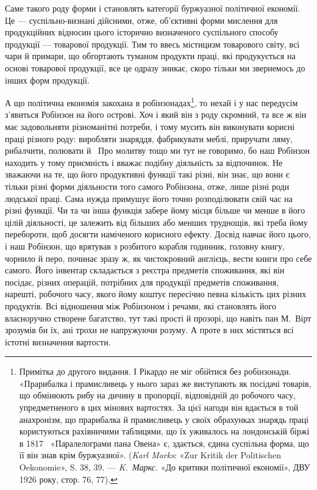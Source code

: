 
Саме такого роду форми і становлять категорії буржуазної
політичної економії. Це — суспільно-визнані дійсними, отже,
об’єктивні форми мислення для продукційних відносин цього
історично визначеного суспільного способу продукції — товарової
продукції. Тим то ввесь містицизм товарового світу, всі чари й
примари, що обгортають туманом продукти праці, які продукується
на основі товарової продукції, все це одразу зникає, скоро
тільки ми звернемось до інших форм продукції.

А що політична економія закохана в робінзонадах\footnote{
Примітка до другого видання. І Рікардо не міг обійтися без робінзонади.
«Прарибалка і прамисливець у нього зараз же виступають
як посідачі товарів, що обмінюють рибу на дичину в пропорції, відповідній
до робочого часу, упредметненого в цих мінових вартостях. За цієї
нагоди він вдається в той анахронізм, що прарибалка й прамисливець
у своїх обрахунках знарядь праці користуються рахівничими таблицями,
що їх уживалось на лондонській біржі в 1817~ «Паралелограми пана
Овена» є, здається, єдина суспільна форма, що її він знав крім буржуазної».
(\emph{Karl Marks}: «Zur Kritik der Politischen Oekonomie», S. 38, 39. —
\emph{K.~Маркс.} «До критики політичної економії», ДВУ 1926 року,
стор. 76, 77).
}, то нехай
і у нас передусім з’явиться Робінзон на його острові. Хоч і який
він з роду скромний, та все ж він має задовольняти різноманітні
потреби, і тому мусить він виконувати корисні праці різного
роду: виробляти знаряддя, фабрикувати меблі, приручати ляму,
рибалчити, полювати й~ Про молитву тощо ми тут не говоримо,
бо наш Робінзон находить у тому приємність і вважає подібну
діяльність за відпочинок. Не зважаючи на те, що його продуктивні
функції такі різні, він знає, що вони є тільки різні форми
діяльности того самого Робінзона, отже, лише різні роди людської
праці. Сама нужда примушує його точно розподілювати свій час
на різні функції. Чи та чи інша функція забере йому місця більше
чи менше в його цілій діяльності, це залежить від більших або
менших труднощів, які треба йому перебороти, щоб досягти наміченого
корисного ефекту. Досвід навчає його цього, і наш Робінзон,
що врятував з розбитого корабля годинник, головну книгу,
чорнило й перо, починає зразу ж, як чистокровний англієць, вести
книги про себе самого. Його інвентар складається з реєстра предметів
споживання, які він посідає, різних операцій, потрібних для
продукції предметів споживання, нарешті, робочого часу, якого
йому коштує пересічно певна кількість цих різних продуктів. Всі
відношення між Робінзоном і речами, які становлять його власноручно
створене багатство, тут такі прості й прозорі, що навіть
пан М.~Вірт зрозумів би їх, ані трохи не напружуючи розуму.
А проте в них містяться всі істотні визначення вартости.

